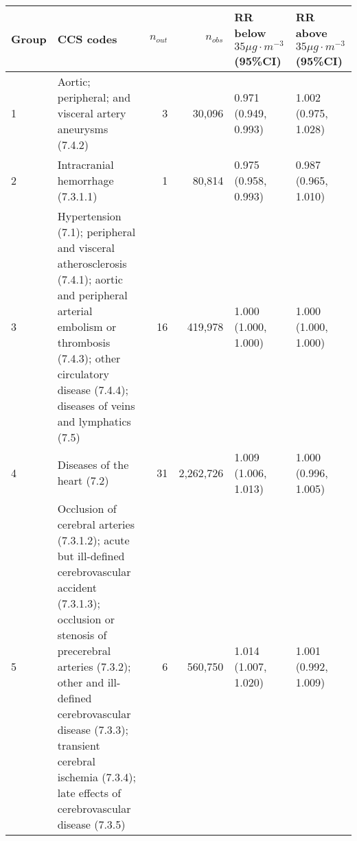 \begin{tabular}{lp{7.2cm}rrp{2.2cm}p{2.2cm}}
  \hline
Group & CCS codes & $n_{out}$ & $n_{obs}$ & RR below $35 \mu g \cdot m^{-3}$ (95\%CI) & RR above $35 \mu g \cdot m^{-3}$ (95\%CI) \\ 
  \hline
   1 & Aortic; peripheral; and visceral artery aneurysms (7.4.2) &    3 & 30,096 & 0.971 (0.949, 0.993) & 1.002 (0.975, 1.028) \\ 
     2 & Intracranial hemorrhage (7.3.1.1) &    1 & 80,814 & 0.975 (0.958, 0.993) & 0.987 (0.965, 1.010) \\ 
     3 & Hypertension (7.1); peripheral and visceral atherosclerosis (7.4.1); aortic and peripheral arterial embolism or thrombosis (7.4.3); other circulatory disease (7.4.4); diseases of veins and lymphatics (7.5) &   16 & 419,978 & 1.000 (1.000, 1.000) & 1.000 (1.000, 1.000) \\ 
     4 & Diseases of the heart (7.2) &   31 & 2,262,726 & 1.009 (1.006, 1.013) & 1.000 (0.996, 1.005) \\ 
     5 & Occlusion of cerebral arteries (7.3.1.2); acute but ill-defined cerebrovascular accident (7.3.1.3); occlusion or stenosis of precerebral arteries (7.3.2); other and ill-defined cerebrovascular disease (7.3.3); transient cerebral ischemia (7.3.4); late effects of cerebrovascular disease (7.3.5) &    6 & 560,750 & 1.014 (1.007, 1.020) & 1.001 (0.992, 1.009) \\ 
   \hline
\end{tabular}

